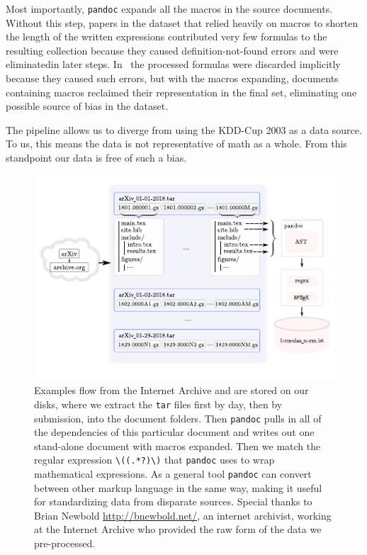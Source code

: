 \documentclass[12pt]{article}
\begin{document}
Most importantly, \texttt{pandoc} expands all the macros in the source
documents. Without this step, papers in the dataset that relied heavily on
macros to shorten the length of the written expressions contributed very few
formulas to the resulting collection because they caused definition-not-found
errors and were eliminatedin later steps. In~\cite{deng2016you} the processed
formulas were discarded implicitly because they caused such errors, but with the
macros expanding, documents containing macros reclaimed their representation in
the final set, eliminating one possible source of bias in the dataset.

The pipeline allows us to diverge from using the KDD-Cup 2003 as a data source.
To us, this means the data is not representative of math as a whole. From this
standpoint our data is free of such a bias.

\begin{figure}[tbp]
\begin{adjustwidth}{-1in}{-1in}%
		\includegraphics[scale=2.0]{harvest.pdf}
    \centering
\end{adjustwidth}
    \cprotect\caption{Examples flow from the Internet Archive and are stored on
    our disks, where we extract the \texttt{tar} files first by day, then by
    submission, into the document folders. Then \texttt{pandoc} pulls in all of
    the dependencies of this particular document and writes out one stand-alone
    document with macros expanded. Then we match the regular expression
    \verb|\((.*?)\)| that \texttt{pandoc} uses to wrap mathematical expressions.
    As a general tool \texttt{pandoc} can convert between other markup language
    in the same way, making it useful for standardizing data from disparate
    sources. Special thanks to Brian Newbold \url{http://bnewbold.net/}, an
    internet archivist, working at the Internet Archive who provided the raw
    form of the data we pre-processed.}\label{datapipeline}
\end{figure}
\end{document}
